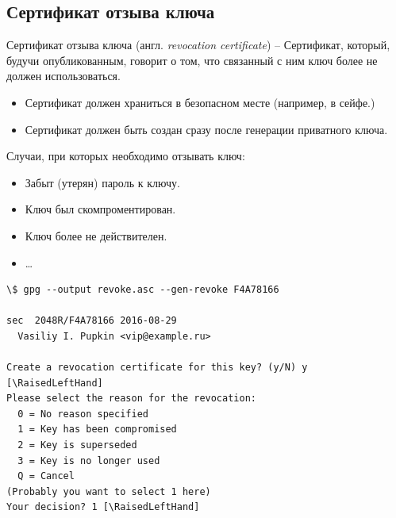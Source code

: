 \documentclass[presentation]{beamer}
\newcommand{\RaisedLeftHand}{%
  \raisebox{-.50em}{\Large\HandLeft}
}
\newcommand{\EndOfSectionOrnament}{
  \begin{center}
    \pgfornament[width=0.5\textwidth]{88}
    \end{center}
}
\begin{document}


\subsection{Сертификат отзыва ключа}

\begin{frame}[fragile]{}
  \raisebox{-.30em}{\Large\HandRight}\hspace{.25em} Сертификат отзыва
  ключа (англ. \emph{revocation certificate}) -- Сертификат, который,
  будучи опубликованным, говорит о том, что связанный с ним ключ более
  не должен использоваться.\newline

  \begin{itemize}
  \item Сертификат должен храниться в безопасном месте (например, в
    сейфе.)
  \item Сертификат должен быть создан сразу после генерации приватного
    ключа.\newline
  \end{itemize}
  
  Случаи, при которых необходимо отзывать ключ:
  \begin{itemize}
  \item Забыт (утерян) пароль к ключу.
  \item Ключ был скомпроментирован.
  \item Ключ более не действителен.
  \item \ldots{}
  \end{itemize}
\end{frame}

\begin{frame}[fragile]{}
  \small
\begin{Verbatim}[commandchars=\\\[\]]
\$ gpg --output revoke.asc --gen-revoke F4A78166

sec  2048R/F4A78166 2016-08-29
  Vasiliy I. Pupkin <vip@example.ru>

Create a revocation certificate for this key? (y/N) y [\RaisedLeftHand]
Please select the reason for the revocation:
  0 = No reason specified
  1 = Key has been compromised
  2 = Key is superseded
  3 = Key is no longer used
  Q = Cancel
(Probably you want to select 1 here)
Your decision? 1 [\RaisedLeftHand]
\end{Verbatim}
\normalsize
\EndOfSectionOrnament
\end{frame}
\end{document}
